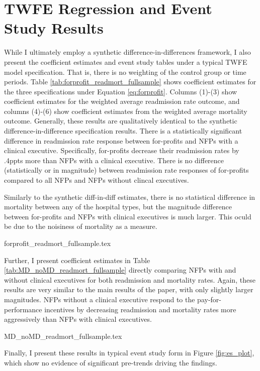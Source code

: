 \documentclass[12pt]{article}
\begin{document}
\section{TWFE Regression and Event Study Results}\label{app:fullsample}

While I ultimately employ a synthetic difference-in-differences framework, I also present the coefficient estimates and event study tables under a typical TWFE model specification. That is, there is no weighting of the control group or time periods. Table \ref{tab:forprofit_readmort_fullsample} shows coefficient estimates for the three specifications under Equation \ref{eq:forprofit}. Columns (1)-(3) show coefficient estimates for the weighted average readmission rate outcome, and columns (4)-(6) show coefficient estimates from the weighted average mortality outcome. Generally, these results are qualitatively identical to the synthetic difference-in-difference specification results. There is a statistically significant difference in readmission rate response between for-profits and NFPs with a clinical executive. Specifically, for-profits decrease their readmission rates by .4ppts more than NFPs with a clinical executive. There is no difference (statistically or in magnitude) between readmission rate responses of for-profits compared to all NFPs and NFPs without clincal executives. 

Similarly to the synthetic diff-in-diff estimates, there is no statistical difference in mortality between any of the hospital types, but the magnitude difference between for-profits and NFPs with clinical executives is much larger. This oculd be due to the noisiness of mortality as a measure. 

{forprofit_readmort_fullsample.tex}

Further, I present coefficient estimates in Table \ref{tab:MD_noMD_readmort_fullsample} directly comparing NFPs with and without clinical executives for both readmission and mortality rates. Again, these results are very similar to the main results of the paper, with only slightly larger magnitudes. NFPs without a clinical executive respond to the pay-for-performance incentives by decreasing readmission and mortality rates more aggressively than NFPs with clinical executives. 

{MD_noMD_readmort_fullsample.tex}

Finally, I present these results in typical event study form in Figure \ref{fig:es_plot}, which show no evidence of significant pre-trends driving the findings. 
\end{document}
